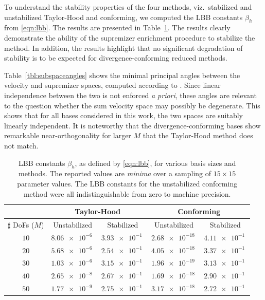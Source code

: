 \documentclass[onecolumn, twoside, a4paper, 11pt]{article}
\begin{document}
To understand the stability properties of the four methods, viz.~stabilized and unstabilized Taylor-Hood and
conforming, we computed the LBB constants $\beta_h$ from \eqref{eqn:lbb}. The results are presented
in Table~\ref{tbl:lbb}. The results clearly demonstrate the ability of the supremizer enrichment
procedure to stabilize the method. In addition, the results highlight that no significant degradation
of stability is to be expected for divergence-conforming reduced methods.

Table~\ref{tbl:subspaceangles} shows the minimal principal angles between the velocity and supremizer
spaces, computed according to \cite{Knyazev2002pab}. Since linear independence between the two is
not enforced \emph{a priori}, these angles are relevant to the question whether the sum velocity
space may possibly be degenerate. This shows that for all bases considered in this work, the two
spaces are suitably linearly independent. It is noteworthy that the divergence-conforming bases show
remarkable near-orthogonality for larger $M$ that the Taylor-Hood method does not match.

\begin{table}
  \begin{center}
    \bgroup{}
    \begin{tabular}{crrrr}
      & \multicolumn{2}{c}{\bf Taylor-Hood} & \multicolumn{2}{c}{\bf Conforming} \\
      \hline
      $\sharp$ DoFs ($M$)
      & \multicolumn{1}{c}{Unstabilized} & \multicolumn{1}{c}{Stabilized}
      & \multicolumn{1}{c}{Unstabilized} & \multicolumn{1}{c}{Stabilized} \\
      \hline $10$ & $\SI{8.06e-6}{}$ & $\SI{3.93e-1}{}$ & $\SI{2.68e-18}{}$ & $\SI{4.11e-1}{}$ \\
      $20$ & $\SI{5.68e-6}{}$ & $\SI{2.54e-1}{}$ & $\SI{4.05e-18}{}$ & $\SI{3.37e-1}{}$ \\
      $30$ & $\SI{1.03e-6}{}$ & $\SI{3.15e-1}{}$ & $\SI{1.96e-19}{}$ & $\SI{3.13e-1}{}$ \\
      $40$ & $\SI{2.65e-8}{}$ & $\SI{2.67e-1}{}$ & $\SI{1.69e-18}{}$ & $\SI{2.90e-1}{}$ \\
      $50$ & $\SI{1.77e-9}{}$ & $\SI{2.75e-1}{}$ & $\SI{3.17e-18}{}$ & $\SI{2.72e-1}{}$ \\
      \hline
    \end{tabular}
    \egroup
  \end{center}
  \caption{
    LBB constants $\beta_h$, as defined by \eqref{eqn:lbb}, for various basis
    sizes and methods. The reported values are \emph{minima} over a sampling of
    $15 \times 15$ parameter values. The LBB constants for the unstabilized conforming
    method were all indistinguishable from zero to machine precision.
  }
  \label{tbl:lbb}
\end{table}
\end{document}
